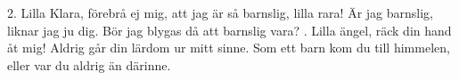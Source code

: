 \begin{multicols}{2}
2.  Lilla Klara, förebrå ej mig,
    att jag är så barnslig, lilla rara!
    Är jag barnslig, liknar jag ju dig.
    Bör jag blygas då att barnslig vara?
\vfill{}.  Lilla ängel, räck din hand åt mig!
    Aldrig går din lärdom ur mitt sinne.
    Som ett barn kom du till himmelen,
    eller var du aldrig än därinne.
\end{multicols}
